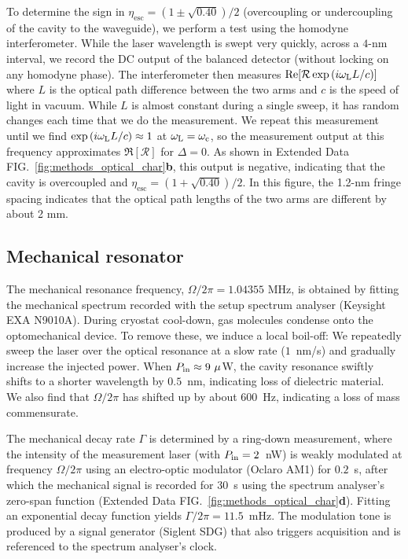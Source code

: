 \documentclass[./Main-revtex.tex]{subfiles}
\begin{document}
To determine the sign in $\eta_\text{esc}=(1\pm\sqrt{0.40})/2$ (overcoupling or undercoupling of the cavity to the waveguide), we perform a test using the homodyne interferometer. While the laser wavelength is swept very quickly, across a $4$-nm interval, we record the DC output of the balanced detector (without locking on any homodyne phase). The interferometer then measures $\operatorname{Re}[\mathcal{R}\exp{(i\omega_{\text{L}}L/c)}]$ where $L$ is the optical path difference between the two arms and $c$ is the speed of light in vacuum. While $L$ is almost constant during a single sweep, it has random changes each time that we do the measurement. We repeat this measurement until we find $\exp{(i\omega_{\text{L}}L/c)} \approx 1$ at $\omega_{\text{L}}=\omega_{\text{c}}$, so the measurement output at this frequency approximates $\Re[\mathcal{R}]$ for $\Delta=0$. As shown in Extended Data FIG.~\ref{fig:methods_optical_char}\textbf{b}, this output is negative, indicating that the cavity is overcoupled and $\eta_\text{esc}=(1+\sqrt{0.40})/2$. In this figure, the 1.2-nm fringe spacing indicates that the optical path lengths of the two arms are different by about 2 mm.

\subsection{Mechanical resonator}
\label{sec:methods:char_mechanical}
The mechanical resonance frequency, $\Omega/2\pi = 1.04355$ MHz, is obtained by fitting the mechanical spectrum recorded with the setup spectrum analyser (Keysight EXA N9010A).
During cryostat cool-down, gas molecules condense onto the optomechanical device. To remove these, we induce a local boil-off: We repeatedly sweep the laser over the optical resonance at a slow rate ($1$~nm/s) and gradually increase the injected power. When $P_\text{in} \approx 9~\mu$W, the cavity resonance swiftly shifts to a shorter wavelength by $0.5$~nm, indicating loss of dielectric material. We also find that $\Omega/2\pi$ has shifted up by about 600~Hz, indicating a loss of mass commensurate.

    

The mechanical decay rate $\Gamma$ is determined by a ring-down measurement, where the intensity of the measurement laser (with $P_\text{in} = 2$~nW) is weakly modulated at frequency $\Omega/2\pi$ using an electro-optic modulator (Oclaro AM1) for $0.2$~s, after which the mechanical signal is recorded for $30$~s using the spectrum analyser's zero-span function (Extended Data FIG.~\ref{fig:methods_optical_char}\textbf{d}).
Fitting an exponential decay function yields $\Gamma/2\pi=11.5$~mHz. The modulation tone is produced by a signal generator (Siglent SDG) that also triggers acquisition and is referenced to the spectrum analyser's clock.
\end{document}
